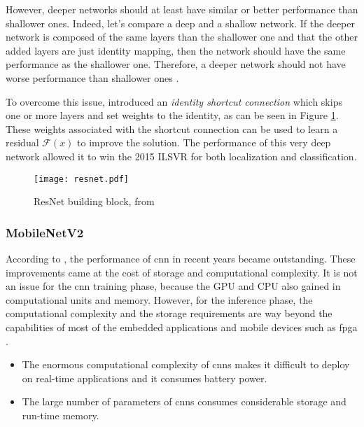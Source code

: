 However, deeper networks should at least have similar or better performance than shallower ones. Indeed, let’s compare a deep and a shallow network. If the deeper network is composed of the same layers than the shallower one and that the other added layers are just identity mapping, then the network should have the same performance as the shallower one. Therefore, a deeper network should not have worse performance than shallower ones \cite{matteucci_artificial_2019}.

To overcome this issue, \textcite{he_deep_2016} introduced an \textit{identity shortcut connection} which skips one or more layers and set weights to the identity, as can be seen in Figure \ref{fig:resnet}. These weights associated with the shortcut connection can be used to learn a residual $\mathcal{F}(x)$ to improve the solution. The performance of this very deep network allowed it to win the 2015 ILSVR for both localization and classification.
%
\begin{figure}[H]
    \centering
    \texttt{[image: resnet.pdf]}
    \caption{ResNet building block, from \cite{he_deep_2016}}
    \label{fig:resnet}
\end{figure}
%
\subsubsection{MobileNetV2} \label{subs:mbv2}
%
According to \textcite{cheng_recent_2018}, the performance of \acrshort{cnn} in recent years became outstanding. These improvements came at the cost of storage and computational complexity. It is not an issue for the \acrshort{cnn} training phase, because the GPU and CPU also gained in computational units and memory. However, for the inference phase, the computational complexity and the storage requirements are way beyond the capabilities of most of the embedded applications and mobile devices such as \acrshort{fpga} \cite{cheng_recent_2018}.
%
\begin{itemize}
    \item The enormous computational complexity of \acrshort{cnn}s makes it difficult to deploy on real-time applications and it consumes battery power.
    \item The large number of parameters of \acrshort{cnn}s consumes considerable storage and run-time memory.
\end{itemize}

